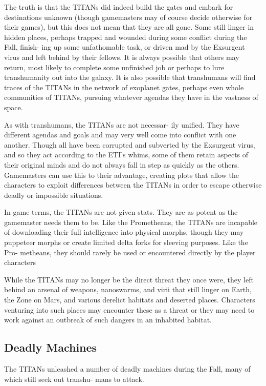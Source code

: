 The truth is that the TITANs did indeed build the 
gates and embark for destinations unknown (though 
gamemasters may of course decide otherwise for their 
games), but this does not mean that they are all gone. 
Some still linger in hidden places, perhaps trapped and 
wounded during some conflict during the Fall, finish-
ing up some unfathomable task, or driven mad by the 
Exsurgent virus and left behind by their fellows. It is 
always possible that others may return, most likely 
to complete some unfinished job or perhaps to lure 
transhumanity out into the galaxy. It is also possible 
that transhumans will find traces of the TITANs in 
the network of exoplanet gates, perhaps even whole 
communities of TITANs, pursuing whatever agendas 
they have in the vastness of space.

As with transhumans, the TITANs are not necessar-
ily unified. They have different agendas and goals and 
may very well come into conflict with one another. 
Though all have been corrupted and subverted by the 
Exsurgent virus, and so they act according to the ETI's 
whims, some of them retain aspects of their original 
minds and do not always fall in step as quickly as the 
others. Gamemasters can use this to their advantage, 
creating plots that allow the characters to exploit 
differences between the TITANs in order to escape 
otherwise deadly or impossible situations.

In game terms, the TITANs are not given stats. 
They are as potent as the gamemaster needs them to 
be. Like the Prometheans, the TITANs are incapable 
of downloading their full intelligence into physical 
morphs, though they may puppeteer morphs or create 
limited delta forks for sleeving purposes. Like the Pro-
metheans, they should rarely be used or encountered 
directly by the player characters

While the TITANs may no longer be the direct 
threat they once were, they left behind an arsenal of 
weapons, nanoswarms, and virii that still linger on 
Earth, the Zone on Mars, and various derelict habitats 
and deserted places. Characters venturing into such 
places may encounter these as a threat or they may 
need to work against an outbreak of such dangers in 
an inhabited habitat.

\subsection{Deadly Machines}

The TITANs unleashed a number of deadly machines 
during the Fall, many of which still seek out transhu-
mans to attack.

